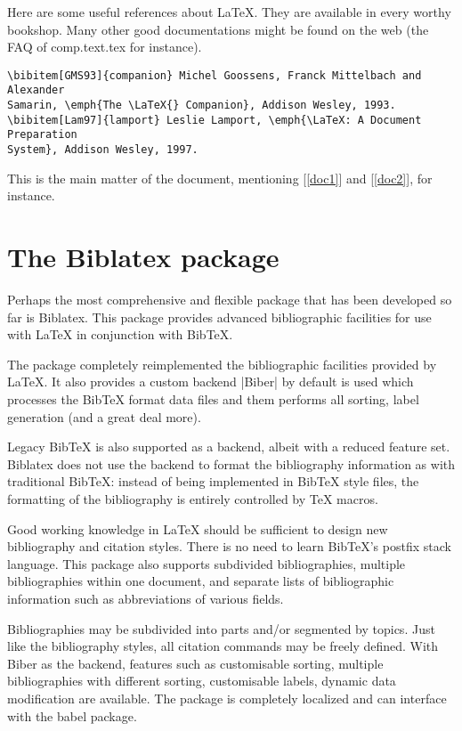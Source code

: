 \begin{refsection}
Here are some useful references about \LaTeX. They are
available in every worthy bookshop. Many other good documentations
might be found on the web (the FAQ of \textsf{comp.text.tex} for
instance).


\begin{verbatim}
\bibitem[GMS93]{companion} Michel Goossens, Franck Mittelbach and Alexander
Samarin, \emph{The \LaTeX{} Companion}, Addison Wesley, 1993.
\bibitem[Lam97]{lamport} Leslie Lamport, \emph{\LaTeX: A Document Preparation
System}, Addison Wesley, 1997.
\end{verbatim}

This is the main matter of the document, mentioning
[\ref{doc1}] and [\ref{doc2}], for instance.

\section{The Biblatex package}

Perhaps the most comprehensive and flexible package that has been developed so far is Biblatex.
This package provides advanced bibliographic facilities for use with LaTeX in conjunction
with BibTeX. 

The package completely reimplemented  the bibliographic
facilities provided by LaTeX. It also provides a  custom backend |Biber| by default is used which processes
the BibTeX format data files and them performs all sorting, label generation
(and a great deal more). 

Legacy BibTeX is also supported as a backend, albeit with a
reduced feature set. Biblatex does not use the backend to format the bibliography
information as with traditional BibTeX: instead of being implemented in BibTeX
style files, the formatting of the bibliography is entirely controlled by TeX macros.

Good working knowledge in LaTeX should be sufficient to design new bibliography
and citation styles. There is no need to learn BibTeX’s postfix stack language. This
package also supports subdivided bibliographies, multiple bibliographies within
one document, and separate lists of bibliographic information such as abbreviations
of various fields. 

Bibliographies may be subdivided into parts and/or segmented
by topics. Just like the bibliography styles, all citation commands may be freely
defined. With Biber as the backend, features such as customisable sorting, multiple
bibliographies with different sorting, customisable labels, dynamic data modification
are available. The package is completely localized and can interface with the babel
package. 


\end{refsection}
